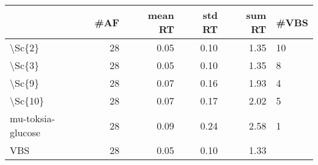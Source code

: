 \begin{tabular}{lrrrrl}
\toprule
{} &  \#AF &  mean RT &  std RT &  sum RT & \#VBS \\
\midrule
\textbackslash Sc\{2\}            &   28 &     0.05 &    0.10 &    1.35 &   10 \\
\textbackslash Sc\{3\}            &   28 &     0.05 &    0.10 &    1.35 &    8 \\
\textbackslash Sc\{9\}            &   28 &     0.07 &    0.16 &    1.93 &    4 \\
\textbackslash Sc\{10\}           &   28 &     0.07 &    0.17 &    2.02 &    5 \\
mu-toksia-glucose &   28 &     0.09 &    0.24 &    2.58 &    1 \\
VBS               &   28 &     0.05 &    0.10 &    1.33 &      \\
\bottomrule
\end{tabular}
